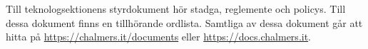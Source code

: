 Till teknologsektionens styrdokument hör stadga, reglemente och policys. Till dessa dokument finns en tillhörande ordlista. Samtliga av dessa dokument går att hitta på \url{https://chalmers.it/documents} eller \url{https://docs.chalmers.it}. 
